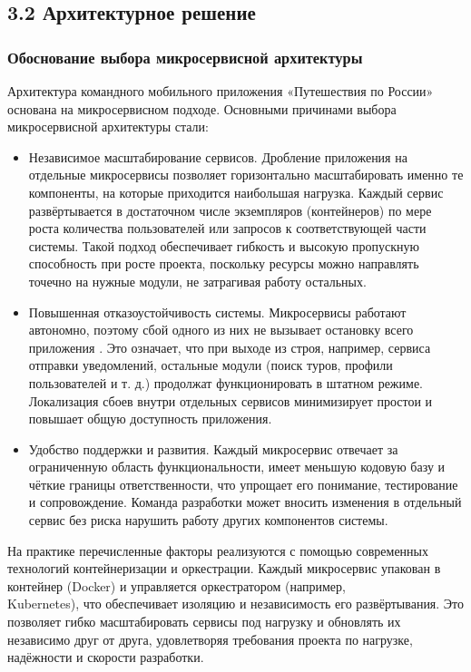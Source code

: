 \noindent \subsection*{3.2 Архитектурное решение}

\noindent \subsubsection*{Обоснование выбора микросервисной архитектуры}
Архитектура командного мобильного приложения «Путешествия по России» основана на микросервисном подходе. Основными причинами выбора микросервисной архитектуры стали:
\begin{itemize}
    \item Независимое масштабирование сервисов. Дробление приложения на отдельные микросервисы позволяет горизонтально масштабировать именно те компоненты, на которые приходится наибольшая нагрузка. Каждый сервис развёртывается в достаточном числе экземпляров (контейнеров) по мере роста количества пользователей или запросов к соответствующей части системы. Такой подход обеспечивает гибкость и высокую пропускную способность при росте проекта, поскольку ресурсы можно направлять точечно на нужные модули, не затрагивая работу остальных.
    \item Повышенная отказоустойчивость системы. Микросервисы работают автономно, поэтому сбой одного из них не вызывает остановку всего приложения \cite{6}. Это означает, что при выходе из строя, например, сервиса отправки уведомлений, остальные модули (поиск туров, профили пользователей и т. д.) продолжат функционировать в штатном режиме. Локализация сбоев внутри отдельных сервисов минимизирует простои и повышает общую доступность приложения.
    \item Удобство поддержки и развития. Каждый микросервис отвечает за ограниченную область функциональности, имеет меньшую кодовую базу и чёткие границы ответственности, что упрощает его понимание, тестирование и сопровождение. Команда разработки может вносить изменения в отдельный сервис без риска нарушить работу других компонентов системы.
\end{itemize}
\noindent На практике перечисленные факторы реализуются с помощью современных технологий контейнеризации и оркестрации. Каждый микросервис упакован в контейнер (Docker) и управляется оркестратором (например, \\ Kubernetes), что обеспечивает изоляцию и независимость его развёртывания. Это позволяет гибко масштабировать сервисы под нагрузку и обновлять их независимо друг от друга, удовлетворяя требования проекта по нагрузке, надёжности и скорости разработки.

